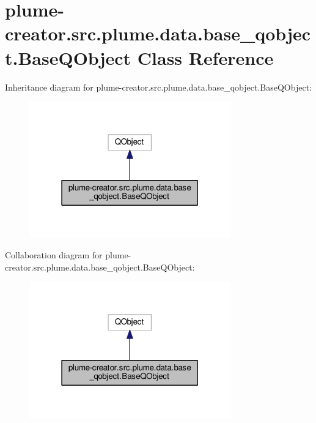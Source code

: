 \hypertarget{classplume-creator_1_1src_1_1plume_1_1data_1_1base__qobject_1_1_base_q_object}{}\section{plume-\/creator.src.\+plume.\+data.\+base\+\_\+qobject.\+Base\+Q\+Object Class Reference}
\label{classplume-creator_1_1src_1_1plume_1_1data_1_1base__qobject_1_1_base_q_object}


Inheritance diagram for plume-\/creator.src.\+plume.\+data.\+base\+\_\+qobject.\+Base\+Q\+Object\+:\nopagebreak
\begin{figure}[H]
\begin{center}
\leavevmode
\includegraphics[width=247pt]{classplume-creator_1_1src_1_1plume_1_1data_1_1base__qobject_1_1_base_q_object__inherit__graph}
\end{center}
\end{figure}


Collaboration diagram for plume-\/creator.src.\+plume.\+data.\+base\+\_\+qobject.\+Base\+Q\+Object\+:\nopagebreak
\begin{figure}[H]
\begin{center}
\leavevmode
\includegraphics[width=247pt]{classplume-creator_1_1src_1_1plume_1_1data_1_1base__qobject_1_1_base_q_object__coll__graph}
\end{center}
\end{figure}
